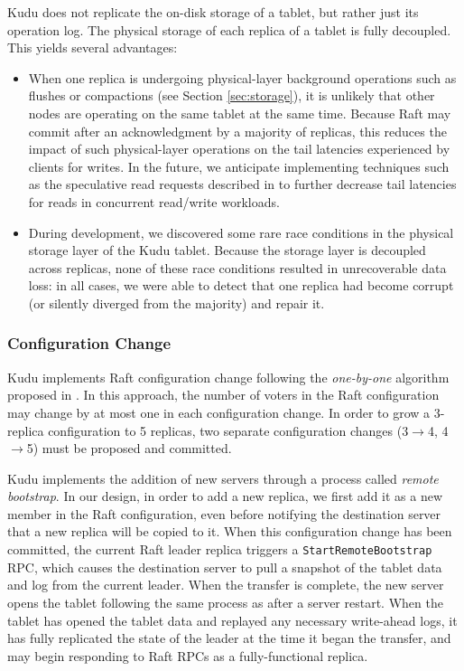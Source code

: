 \documentclass{vldb}
\begin{document}
Kudu does not replicate the on-disk storage of a tablet, but rather just
its operation log. The physical storage of each replica of a tablet is fully decoupled.
This yields several advantages:

\begin{itemize}

\item When one replica is undergoing physical-layer background operations such as flushes or compactions
(see Section \ref{sec:storage}), it is unlikely that other nodes are operating on the same tablet at the same time. Because
Raft may commit after an acknowledgment by a majority of replicas, this reduces the impact
of such physical-layer operations on the tail latencies experienced by clients for writes.
In the future, we anticipate implementing techniques such as the speculative read requests
described in \cite{tail_at_scale} to further decrease tail latencies for reads in concurrent read/write
workloads.

\item During development, we discovered some rare race conditions in the physical storage
layer of the Kudu tablet. Because the storage layer is decoupled across replicas, none of these
race conditions resulted in unrecoverable data loss: in all cases, we were able to detect that one
replica had become corrupt (or silently diverged from the majority) and repair it.
\end{itemize}

\subsubsection{Configuration Change}

Kudu implements Raft configuration change following the {\em one-by-one} algorithm proposed in
\cite{diego_thesis}. In this approach, the number of voters in the Raft configuration may change
by at most one in each configuration change. In order to grow a 3-replica configuration to 5
replicas, two separate configuration changes (3$\rightarrow$4, 4$\rightarrow$5) must be proposed
and committed.

Kudu implements the addition of new servers through a process called {\em remote bootstrap}.
In our design, in order to add a new replica, we first add it as a new member in the
Raft configuration, even before notifying the destination server that a new replica will
be copied to it. When this configuration change has been committed, the current Raft leader
replica triggers a {\tt StartRemoteBootstrap} RPC, which causes the destination server to pull a
snapshot of the tablet data and log from the current leader. When the transfer
is complete, the new server opens the tablet following the same process as after
a server restart. When the tablet has opened the tablet data and replayed any necessary
write-ahead logs, it has fully replicated the state of the leader at the time it began the transfer,
and may begin responding to Raft RPCs as a fully-functional replica.
\end{document}

